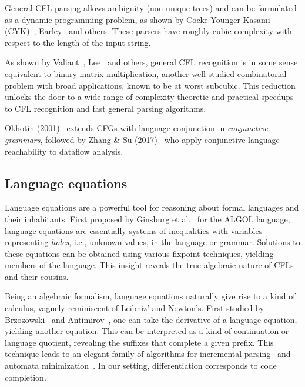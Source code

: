 \documentclass[sigplan,review,anonymous,acmsmall]{acmart}\settopmatter{printfolios=false,printccs=false,printacmref=false}
\begin{document}
  General CFL parsing allows ambiguity (non-unique trees) and can be formulated as a dynamic programming problem, as shown by Cocke-Younger-Kasami (CYK)~\cite{sakai1961syntax}, Earley~\cite{earley1970efficient} and others. These parsers have roughly cubic complexity with respect to the length of the input string.

  As shown by Valiant~\cite{valiant1975general}, Lee~\cite{lee2002fast} and others, general CFL recognition is in some sense equivalent to binary matrix multiplication, another well-studied combinatorial problem with broad applications, known to be at worst subcubic. This reduction unlocks the door to a wide range of complexity-theoretic and practical speedups to CFL recognition and fast general parsing algorithms.

  Okhotin (2001)~\cite{okhotin2001conjunctive} extends CFGs with language conjunction in \textit{conjunctive grammars}, followed by Zhang \& Su (2017)~\cite{zhang2017context} who apply conjunctive language reachability to dataflow analysis.

  \subsection{Language equations}

  Language equations are a powerful tool for reasoning about formal languages and their inhabitants. First proposed by Ginsburg et al.~\cite{ginsburg1962two} for the ALGOL language, language equations are essentially systems of inequalities with variables representing \textit{holes}, i.e., unknown values, in the language or grammar. Solutions to these equations can be obtained using various fixpoint techniques, yielding members of the language. This insight reveals the true algebraic nature of CFLs and their cousins.

  Being an algebraic formalism, language equations naturally give rise to a kind of calculus, vaguely reminiscent of Leibniz' and Newton's. First studied by Brzozowski~\cite{brzozowski1964derivatives, brzozowski1980equations} and Antimirov~\cite{antimirov1996partial}, one can take the derivative of a language equation, yielding another equation. This can be interpreted as a kind of continuation or language quotient, revealing the suffixes that complete a given prefix. This technique leads to an elegant family of algorithms for incremental parsing~\cite{might2011parsing, adams2016complexity} and automata minimization~\cite{brzozowski1962canonical}. In our setting, differentiation corresponds to code completion.
\end{document}
